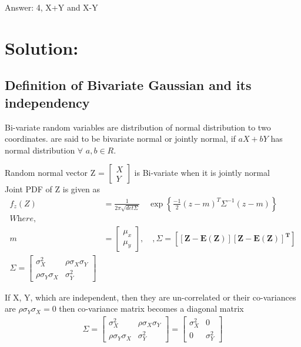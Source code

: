 \documentclass[journal,12pt,twocolumn]{IEEEtran}
\begin{document}
Answer: 4, X+Y and X-Y \\
\section{Solution:} 
\subsection{Definition of Bivariate Gaussian and its independency}
Bi-variate random variables are distribution of normal distribution to two coordinates. are said to be bivariate normal or jointly normal, if $aX+bY$ has normal distribution $\forall$ $a,b \in R$.

Random normal vector Z =
$\begin{bmatrix}
 X\\
 Y
\end{bmatrix}$ is Bi-variate when it is jointly normal\\
Joint PDF of Z is given as\\
\begin{align*}
    f_z(Z) &= \frac{1} {2\pi\sqrt{det {\Sigma}}} \quad \exp \left \{  \frac{-1}{2}(z-m) ^ T \Sigma^{-1} (z-m) \right \} \\
    \textit{Where},\\
    \textit{m} &= \begin{bmatrix}
         \mu_x\\
         \mu_y
        \end{bmatrix}, \quad, \Sigma = \mathbf{[[Z - E(Z)] [Z - E(Z)]^T]}\\
    \Sigma = \begin{bmatrix}
         \sigma_{X}^2               &    \rho \sigma_{X} \sigma_{Y}\\
         \rho \sigma_{Y} \sigma_{X}  &    \sigma_{Y}^2
        \end{bmatrix}
\end{align*}

If X, Y, which  are independent, then they are un-correlated or their co-variances are $\rho \sigma_{Y} \sigma_{X} = 0$ then co-variance matrix becomes a diagonal matrix\\
\begin{align*}
    \Sigma = \begin{bmatrix}
         \sigma_{X}^2                  &     \rho \sigma_{X} \sigma_{Y}\\
         \rho \sigma_{Y} \sigma_{X}     &      \sigma_{Y}^2
        \end{bmatrix} 
        = \begin{bmatrix}
         \sigma_{X}^2      & 0\\
          0  & \sigma_{Y}^2
        \end{bmatrix}
\end{align*}\\
\end{document}
